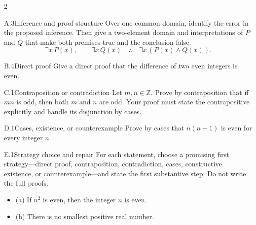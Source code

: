 \documentclass[9pt]{extarticle}
\begin{document}
\begin{multicols}{2}
\begin{CoreProblem}{A.3}{Inference and proof structure}
Over one common domain, identify the error in the proposed inference. Then give
a two-element domain and interpretations of $P$ and $Q$ that make both premises
true and the conclusion false.
\[
\exists x\,P(x),\qquad \exists x\,Q(x)
\quad\therefore\quad
\exists x\,(P(x)\land Q(x)).
\]
\end{CoreProblem}
\begin{CoreProblem}{B.4}{Direct proof}
Give a direct proof that the difference of two even integers is even.
\end{CoreProblem}
\begin{CoreProblem}{C.1}{Contraposition or contradiction}
Let $m,n\in\mathbb Z$. Prove by contraposition that if $mn$ is odd, then both
$m$ and $n$ are odd. Your proof must state the contrapositive explicitly and
handle its disjunction by cases.
\end{CoreProblem}
\columnbreak
\begin{CoreProblem}{D.1}{Cases, existence, or counterexample}
Prove by cases that $n(n+1)$ is even for every integer $n$.
\end{CoreProblem}
\begin{CoreProblem}{E.1}{Strategy choice and repair}
For each statement, choose a promising first strategy---direct proof,
contraposition, contradiction, cases, constructive existence, or
counterexample---and state the first substantive step. Do not write the full
proofs.
\begin{itemize}
  \item (a) If $n^2$ is even, then the integer $n$ is even.
  \item (b) There is no smallest positive real number.
\end{itemize}
\end{CoreProblem}
\end{multicols}
\CoreWorkArea
\FormBreak
{}
\end{document}
